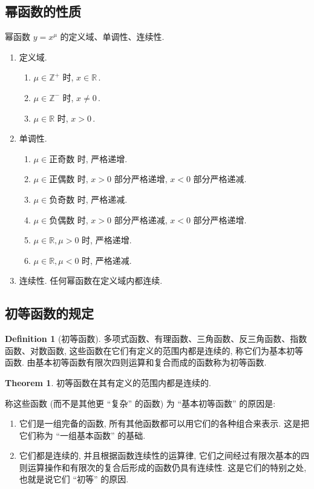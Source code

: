 \documentclass{book}
\newcommand{\R}{\mathbb{R}}
\newcommand{\Z}{\mathbb{Z}}
\numberwithin{equation}{section}
\numberwithin{figure}{section}
\theoremstyle{definition}
\newtheorem{definition}{Definition}
\newtheorem{theorem}{Theorem}[section]
\newcommand{\dq}[1]{``#1''}
\begin{document}
\subsection{幂函数的性质}
幂函数 $y=x^\mu$ 的定义域、单调性、连续性.
\begin{enumerate}
  \item 定义域.
    \begin{enumerate}
      \item $\mu\in\Z^+$ 时, $x\in\R$\,.
      \item $\mu\in\Z^-$ 时, $x\ne0$\,.
      \item $\mu\in\R$ 时, $x>0$\,.
    \end{enumerate}
  \item 单调性.
    \begin{enumerate}
      \item $\mu\in\text{正奇数}$ 时, 严格递增.
      \item $\mu\in\text{正偶数}$ 时, $x>0$ 部分严格递增, $x<0$ 部分严格递减.
      \item $\mu\in\text{负奇数}$ 时, 严格递减.
      \item $\mu\in\text{负偶数}$ 时, $x>0$ 部分严格递减, $x<0$ 部分严格递增.
      \item $\mu\in\R,\mu>0$ 时, 严格递增.
      \item $\mu\in\R,\mu<0$ 时, 严格递减.
    \end{enumerate}
  \item 连续性. 任何幂函数在定义域内都连续.
\end{enumerate}

\subsection{初等函数的规定}
\begin{definition}[初等函数]
  多项式函数、有理函数、三角函数、反三角函数、指数函数、对数函数, 这些函数在它们有定义的范围内都是连续的, 称它们为基本初等函数. 由基本初等函数有限次四则运算和复合而成的函数称为初等函数.
\end{definition}
\begin{theorem}
  初等函数在其有定义的范围内都是连续的.
\end{theorem}

称这些函数 (而不是其他更 ``复杂'' 的函数) 为 \dq{基本初等函数} 的原因是: 
\begin{enumerate}
  \item 它们是一组完备的函数, 所有其他函数都可以用它们的各种组合来表示. 这是把它们称为 ``一组基本函数'' 的基础.
  \item 它们都是连续的, 并且根据函数连续性的运算律, 它们之间经过有限次基本的四则运算操作和有限次的复合后形成的函数仍具有连续性. 这是它们的特别之处, 也就是说它们 ``初等'' 的原因.
\end{enumerate}
\end{document}
